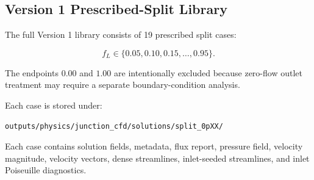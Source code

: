 \subsection{Version 1 Prescribed-Split Library}

The full Version 1 library consists of 19 prescribed split cases:

\[
  f_L \in
  \{0.05, 0.10, 0.15,\ldots,0.95\}.
\]

The endpoints \(0.00\) and \(1.00\) are intentionally excluded because
zero-flow outlet treatment may require a separate boundary-condition analysis.

Each case is stored under:

\begin{verbatim}
outputs/physics/junction_cfd/solutions/split_0pXX/
\end{verbatim}

Each case contains solution fields, metadata, flux report, pressure field,
velocity magnitude, velocity vectors, dense streamlines, inlet-seeded
streamlines, and inlet Poiseuille diagnostics.

